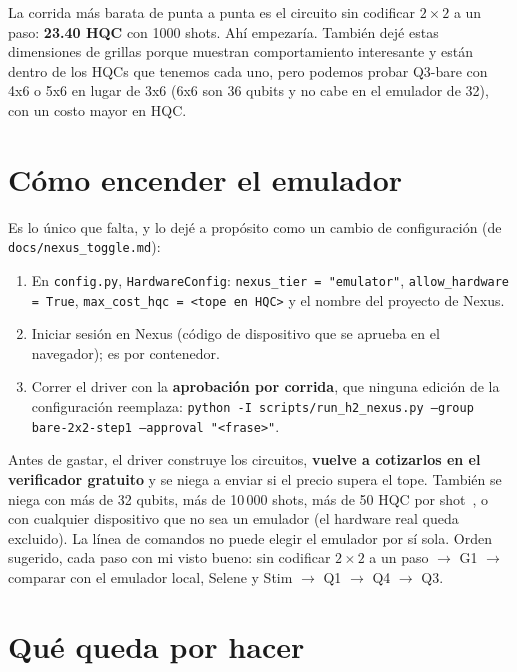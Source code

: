 \documentclass[11pt,a4paper]{article}
\begin{document}
La corrida m\'as barata de punta a punta es el circuito sin codificar $2{\times}2$ a un paso: \textbf{23.40 HQC}
con 1000 shots. Ah\'i empezar\'ia. También dejé estas dimensiones de grillas porque muestran comportamiento interesante y están dentro de los HQCs que tenemos cada uno, pero podemos probar Q3-bare con 4x6 o 5x6 en lugar de 3x6 (6x6 son 36 qubits y no cabe en el emulador de 32), con un costo mayor en HQC.

\section{C\'omo encender el emulador}\label{sec:encender}

Es lo \'unico que falta, y lo dej\'e a prop\'osito como un cambio de configuraci\'on (de \texttt{docs/nexus\_toggle.md}):
\begin{enumerate}[leftmargin=1.6em]
  \item En \texttt{config.py}, \texttt{HardwareConfig}: \texttt{nexus\_tier = "emulator"},
    \texttt{allow\_hardware = True}, \texttt{max\_cost\_hqc = <tope en HQC>} y el nombre del proyecto de Nexus.
  \item Iniciar sesi\'on en Nexus (c\'odigo de dispositivo que se aprueba en el navegador); es por
    contenedor.
  \item Correr el driver con la \textbf{aprobaci\'on por corrida}, que ninguna edici\'on de la configuraci\'on
    reemplaza: \texttt{python -I scripts/run\_h2\_nexus.py --group bare-2x2-step1 --approval "<frase>"}.
\end{enumerate}
Antes de gastar, el driver construye los circuitos, \textbf{vuelve a cotizarlos en el verificador gratuito} y se
niega a enviar si el precio supera el tope. Tambi\'en se niega con m\'as de 32 qubits, m\'as de 10\,000 shots,
m\'as de 50 HQC por shot~\cite{quantinuumh2}, o con cualquier dispositivo que no sea un emulador (el hardware real queda
excluido). La l\'inea de comandos no puede elegir el emulador por s\'i sola. Orden sugerido, cada paso con mi
visto bueno: sin codificar $2{\times}2$ a un paso $\to$ G1 $\to$ comparar con el emulador local, Selene y Stim
$\to$ Q1 $\to$ Q4 $\to$ Q3.

\section{Qu\'e queda por hacer}\label{sec:queda}
\end{document}
